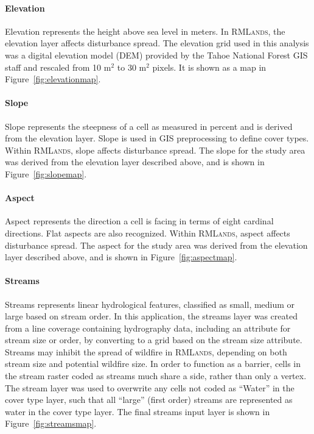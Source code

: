 \paragraph{Elevation} 
Elevation represents the height above sea level in meters. In \textsc{RMLands}, the elevation layer affects disturbance spread. The elevation grid used in this analysis was a digital elevation model (DEM) provided by the Tahoe National Forest GIS staff and rescaled from 10 m$^2$ to 30 m$^2$ pixels. It is shown as a map in Figure~\ref{fig:elevationmap}.



\paragraph{Slope} 
Slope represents the steepness of a cell as measured in percent and is derived from the elevation layer. Slope is used in GIS preprocessing to define cover types. Within \textsc{RMLands}, slope affects disturbance spread. The slope for the study area was derived from the elevation layer described above, and is shown in Figure~\ref{fig:slopemap}.


\paragraph{Aspect} Aspect represents the direction a cell is facing in terms of eight cardinal directions. Flat aspects are also recognized. Within \textsc{RMLands}, aspect affects disturbance spread. The aspect for the study area was derived from the elevation layer described above, and is shown in Figure~\ref{fig:aspectmap}. 


\paragraph{Streams} 
Streams represents linear hydrological features, classified as small, medium or large based on stream order. In this application, the streams layer was created from a line coverage containing hydrography data, including an attribute for stream size or order, by converting to a grid based on the stream size attribute. Streams may inhibit the spread of wildfire in \textsc{RMLands}, depending on both stream size and potential wildfire size. In order to function as a barrier, cells in the stream raster coded as streams much share a side, rather than only a vertex. The stream layer was used to overwrite any cells not coded as ``Water'' in the cover type layer, such that all ``large'' (first order) streams are represented as water in the cover type layer. The final streams input layer is shown in Figure~\ref{fig:streamsmap}.


